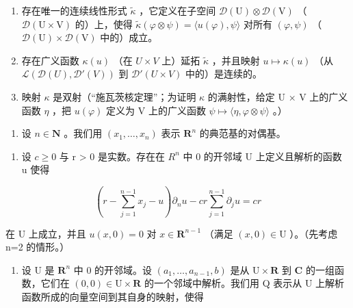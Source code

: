\begin{enumerate}
\def\labelenumi{\alph{enumi})}
\item
  存在唯一的连续线性形式 \(\widetilde{\kappa}\) ，它定义在子空间 \(\mathcal{D}(\mathrm{U})\otimes \mathcal{D}(\mathrm{V})\) （\(\mathcal{D}(\mathrm{U}\times \mathrm{V})\) 的）上，使得 \(\widetilde{\kappa} (\varphi \otimes \psi) = \langle u(\varphi),\psi \rangle\) 对所有 \((\varphi ,\psi)\) （\(\mathcal{D}(\mathrm{U})\times \mathcal{D}(\mathrm{V})\) 中的）成立。
\item
  存在广义函数 \(\kappa(u)\) （在 \(U \times V\) 上）延拓 \(\widetilde{\kappa}\) ，并且映射 \(u \mapsto \kappa(u)\) （从 \(\mathcal{L}(\mathcal{D}(U), \mathcal{D}'(V))\) 到 \(\mathcal{D}'(U \times V)\) 中的）是连续的。
\item
  映射 \(\kappa\) 是双射（“施瓦茨核定理”；为证明 \(\kappa\) 的满射性，给定 U × V 上的广义函数 \(\eta\) ，把 \(u(\varphi)\) 定义为 V 上的广义函数 \(\psi \mapsto \langle \eta, \varphi \otimes \psi \rangle\) 。）
\end{enumerate}

\begin{enumerate}
\def\labelenumi{\arabic{enumi})}
\setcounter{enumi}{29}
\tightlist
\item
  设 \(n \in \mathbf{N}\) 。我们用 \((x_1, \ldots, x_n)\) 表示 \(\mathbf{R}^n\) 的典范基的对偶基。
\end{enumerate}

\begin{enumerate}
\def\labelenumi{\alph{enumi})}
\tightlist
\item
  设 \(c \geqslant 0\) 与 r \textgreater{} 0 是实数。存在在 \(R^{n}\) 中 0 的开邻域 U 上定义且解析的函数 u 使得
\end{enumerate}

\[
\left(r - \sum_ {j = 1} ^ {n - 1} x _ {j} - u\right) \partial_ {n} u - c r \sum_ {j = 1} ^ {n - 1} \partial_ {j} u = c r
\]

在 U 上成立，并且 \(u(x,0)=0\) 对 \(x\in\mathbf{R}^{n-1}\) （满足 \((x,0)\in\mathrm{U}\) ）。（先考虑 n=2 的情形。）

\begin{enumerate}
\def\labelenumi{\alph{enumi})}
\setcounter{enumi}{1}
\tightlist
\item
  设 U 是 \(\mathbf{R}^{n}\) 中 0 的开邻域。设 \((a_{1},\ldots,a_{n-1},b)\) 是从 \(\mathrm{U}\times\mathbf{R}\) 到 \(\mathbf{C}\) 的一组函数，它们在 \((0,0)\in\mathrm{U}\times\mathbf{R}\) 的一个邻域中解析。我们用 Q 表示从 U 上解析函数所成的向量空间到其自身的映射，使得
\end{enumerate}

